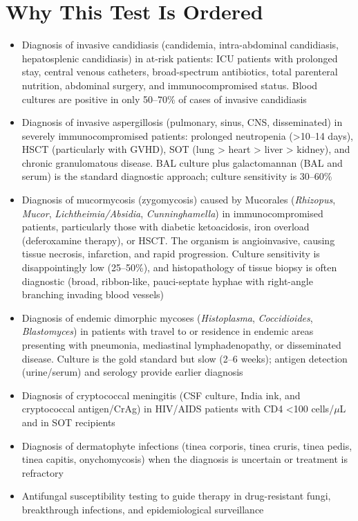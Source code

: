 \section*{Why This Test Is Ordered}
\begin{itemize}
  \item Diagnosis of invasive candidiasis (candidemia, intra-abdominal candidiasis, hepatosplenic candidiasis) in at-risk patients: ICU patients with prolonged stay, central venous catheters, broad-spectrum antibiotics, total parenteral nutrition, abdominal surgery, and immunocompromised status. Blood cultures are positive in only 50--70\% of cases of invasive candidiasis
  \item Diagnosis of invasive aspergillosis (pulmonary, sinus, CNS, disseminated) in severely immunocompromised patients: prolonged neutropenia (>10--14 days), HSCT (particularly with GVHD), SOT (lung > heart > liver > kidney), and chronic granulomatous disease. BAL culture plus galactomannan (BAL and serum) is the standard diagnostic approach; culture sensitivity is 30--60\%
  \item Diagnosis of mucormycosis (zygomycosis) caused by Mucorales (\textit{Rhizopus}, \textit{Mucor}, \textit{Lichtheimia/Absidia}, \textit{Cunninghamella}) in immunocompromised patients, particularly those with diabetic ketoacidosis, iron overload (deferoxamine therapy), or HSCT. The organism is angioinvasive, causing tissue necrosis, infarction, and rapid progression. Culture sensitivity is disappointingly low (25--50\%), and histopathology of tissue biopsy is often diagnostic (broad, ribbon-like, pauci-septate hyphae with right-angle branching invading blood vessels)
  \item Diagnosis of endemic dimorphic mycoses (\textit{Histoplasma}, \textit{Coccidioides}, \textit{Blastomyces}) in patients with travel to or residence in endemic areas presenting with pneumonia, mediastinal lymphadenopathy, or disseminated disease. Culture is the gold standard but slow (2--6 weeks); antigen detection (urine/serum) and serology provide earlier diagnosis
  \item Diagnosis of cryptococcal meningitis (CSF culture, India ink, and cryptococcal antigen/CrAg) in HIV/AIDS patients with CD4 <100 cells/$\mu$L and in SOT recipients
  \item Diagnosis of dermatophyte infections (tinea corporis, tinea cruris, tinea pedis, tinea capitis, onychomycosis) when the diagnosis is uncertain or treatment is refractory
  \item Antifungal susceptibility testing to guide therapy in drug-resistant fungi, breakthrough infections, and epidemiological surveillance
\end{itemize}

